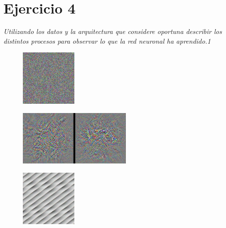 \section*{Ejercicio 4}
\emph{Utilizando los datos y la arquitectura que considere oportuna describir los distintos procesos para observar lo que la red neuronal ha aprendido.1}

\begin{figure}[H]
    \begin{small}
        \begin{center}
            \includegraphics[width=0.25\textwidth]{Figs/random_init_img_epochs_50.pdf}
        \end{center}
        \caption{}
        \label{fig:random_init}
    \end{small}
\end{figure}


\begin{figure}[H]
    \begin{small}
        \begin{center}
            \includegraphics[width=0.5\textwidth]{Figs/random_filters_epochs_50.pdf}
        \end{center}
        \caption{}
        \label{fig:random_filters}
    \end{small}
\end{figure}

\begin{figure}[H]
    \begin{small}
        \begin{center}
            \includegraphics[width=0.25\textwidth]{Figs/sin_init_img_epochs_50.pdf}
        \end{center}
        \caption{}
        \label{fig:sin_init}
    \end{small}
\end{figure}



